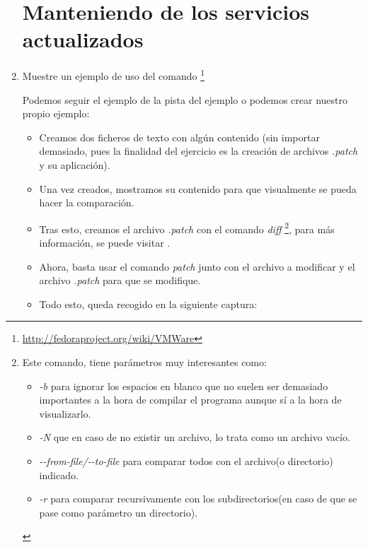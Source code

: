 \documentclass[paper=a4, fontsize=11pt]{scrartcl} %
\numberwithin{equation}{section} %
\numberwithin{figure}{section} %
\numberwithin{table}{section} %
\begin{document}
\begin{enumerate}
	\section{Manteniendo de los servicios actualizados}
		\item Muestre un ejemplo de uso del comando \footnote{\url{http://fedoraproject.org/wiki/VMWare}}
		
		Podemos seguir el ejemplo de la pista del ejemplo o podemos crear nuestro propio ejemplo:
		
		\begin{itemize}
			\item Creamos dos ficheros de texto con algún contenido (sin importar demasiado, pues la
			finalidad del ejercicio es la creación de archivos \textit{.patch} y su aplicación).
			
			\item Una vez creados, mostramos su contenido para que visualmente se pueda hacer la
			comparación.
			
			\item Tras esto, creamos el archivo \textit{.patch} con el comando \textit{diff}
			\footnote{Este comando, tiene parámetros muy interesantes como:
				\begin{itemize}
					\item \textit{-b} para ignorar los espacios en blanco que no suelen ser demasiado
					importantes a la hora de compilar el programa aunque sí a la hora de visualizarlo.
					\item \textit{-N} que en caso de no existir un archivo, lo trata como un archivo vacío.
					\item \textit{-{}-from-file/-{}-to-file} para comparar todos con el archivo(o directorio) %
					indicado.
					\item \textit{-r} para comparar recursivamente con los subdirectorios(en caso de que se
					pase como parámetro un directorio).
				\end{itemize}
			}, para más información, se puede visitar \cite{man_diff}.
			
			\item Ahora, basta usar el comando \textit{patch} \cite{man_patch} junto con el archivo a
			modificar y el archivo \textit{.patch} para que se modifique.
			
			\item Todo esto, queda recogido en la siguiente captura:
			

\end{itemize}
\end{enumerate}
\end{document}
